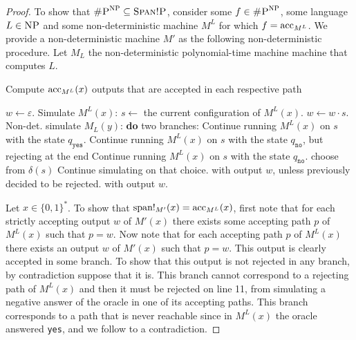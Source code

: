 \begin{proof}
	 To show that $\textsc{\#P}^{\text{{\sc NP}}} \subseteq \textsc{Span!P}$, consider some $f \in \textsc{\#P}^{\text{{\sc NP}}}$, some language $L\in\text{{\sc NP}}$ and some non-deterministic machine $M^L$ for which $f = \text{acc}_{M^L}$. We provide a non-deterministic machine $M'$ as the following non-deterministic procedure. Let $M_L$ the non-deterministic polynomial-time machine machine that computes $L$.
	 \begin{algorithm}
	 \caption{Compute $\text{acc}_{M^L}(x)$ outputs that are accepted in each respective path}
	 \begin{algorithmic}[]
		 \Begin
		 \State $w \gets \varepsilon$.
		 \State Simulate $M^L(x)$:
		 \State $s\gets$ the current configuration of $M^L(x)$.
		 \State $w \gets w \cdot s$.
		 \State Non-det. simulate $M_L(y)$:
		  {\bf do} two branches:
		 \State Continue running $M^L(x)$ on $s$ with the state $q_{\texttt{yes}}$.
		 \State Continue running $M^L(x)$ on $s$ with the state $q_{\texttt{no}}$, but rejecting at the end
		 \EndInEach
		 \State Continue running $M^L(x)$ on $s$ with the state $q_{\texttt{no}}$.
		 \EndInEach
		  choose from $\delta(s)$
		 \State Continue simulating on that choice.
		 \State {} with output $w$, unless previously decided to be rejected.
		 \Else
		 \State {} with output $w$.
		 \EndIf
		 \EndWhile
		 \EndBegin
	 \end{algorithmic}
 	 \end{algorithm}
 	 
	 Let $x\in\{0,1\}^*$. To show that $\text{span}!_{M'}(x) = \text{acc}_{M^L}(x)$, first note that for each strictly accepting output $w$ of $M'(x)$ there exists some accepting path $p$ of $M^L(x)$ such that $p = w$. Now note that for each accepting path $p$ of $M^L(x)$ there exists an output $w$ of $M'(x)$ such that $p = w$. This output is clearly accepted in some branch. To show that this output is not rejected in any branch, by contradiction suppose that it is. This branch cannot correspond to a rejecting path of $M^L(x)$ and then it must be rejected on line 11, from simulating a negative answer of the oracle in one of its accepting paths. This branch corresponds to a path that is never reachable since in $M^L(x)$ the oracle answered {\tt yes}, and we follow to a contradiction. 
\end{proof}